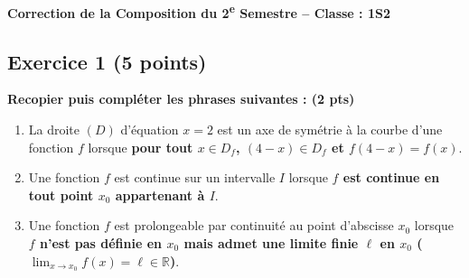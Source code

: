 \documentclass[12pt,a4paper]{article}
\begin{document}
\begin{center}
    \large\textbf{Correction de la Composition du 2\textsuperscript{e} Semestre -- Classe : 1S2}
\end{center}

\hrulefill

\subsection*{Exercice 1 \hfill (5 points)}

\noindent\textbf{Recopier puis compléter les phrases suivantes : (2 pts)}
\begin{enumerate}
    \item[a)] La droite $(D)$ d'équation $x=2$ est un axe de symétrie à la courbe d'une fonction $f$ lorsque \textbf{pour tout $x \in D_f$, $(4 - x) \in D_f$ et $f(4 - x) = f(x)$}.
    \item[b)] Une fonction $f$ est continue sur un intervalle $I$ lorsque \textbf{$f$ est continue en tout point $x_0$ appartenant à $I$}.
    \item[c)] Une fonction $f$ est prolongeable par continuité au point d'abscisse $x_{0}$ lorsque \textbf{$f$ n'est pas définie en $x_0$ mais admet une limite finie $\ell$ en $x_0$ ($\lim_{x \to x_0} f(x) = \ell \in \mathbb{R}$)}.
\end{enumerate}
\end{document}
